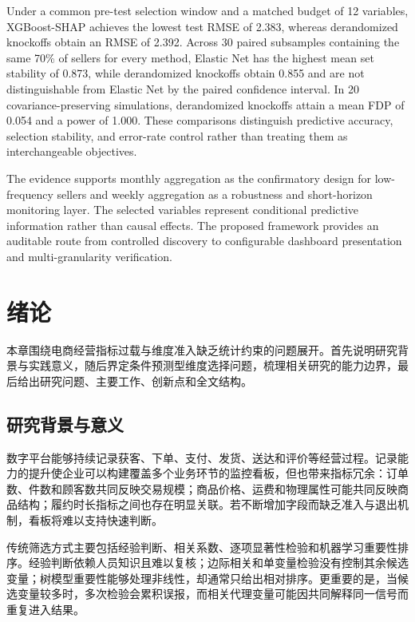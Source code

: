 \documentclass{sufethesismas}
\begin{document}
\begin{abstractEN}
Under a common pre-test selection window and a matched budget of 12 variables, XGBoost-SHAP achieves the lowest test RMSE of 2.383, whereas derandomized knockoffs obtain an RMSE of 2.392. Across 30 paired subsamples containing the same 70\% of sellers for every method, Elastic Net has the highest mean set stability of 0.873, while derandomized knockoffs obtain 0.855 and are not distinguishable from Elastic Net by the paired confidence interval. In 20 covariance-preserving simulations, derandomized knockoffs attain a mean FDP of 0.054 and a power of 1.000. These comparisons distinguish predictive accuracy, selection stability, and error-rate control rather than treating them as interchangeable objectives.

The evidence supports monthly aggregation as the confirmatory design for low-frequency sellers and weekly aggregation as a robustness and short-horizon monitoring layer. The selected variables represent conditional predictive information rather than causal effects. The proposed framework provides an auditable route from controlled discovery to configurable dashboard presentation and multi-granularity verification.
\end{abstractEN}

\tableofcontents

\mainmatter
\chapter{绪论}

本章围绕电商经营指标过载与维度准入缺乏统计约束的问题展开。首先说明研究背景与实践意义，随后界定条件预测型维度选择问题，梳理相关研究的能力边界，最后给出研究问题、主要工作、创新点和全文结构。

\section{研究背景与意义}

数字平台能够持续记录获客、下单、支付、发货、送达和评价等经营过程。记录能力的提升使企业可以构建覆盖多个业务环节的监控看板，但也带来指标冗余：订单数、件数和顾客数共同反映交易规模；商品价格、运费和物理属性可能共同反映商品结构；履约时长指标之间也存在明显关联。若不断增加字段而缺乏准入与退出机制，看板将难以支持快速判断。

传统筛选方式主要包括经验判断、相关系数、逐项显著性检验和机器学习重要性排序。经验判断依赖人员知识且难以复核；边际相关和单变量检验没有控制其余候选变量；树模型重要性能够处理非线性，却通常只给出相对排序。更重要的是，当候选变量较多时，多次检验会累积误报，而相关代理变量可能因共同解释同一信号而重复进入结果。
\end{document}
